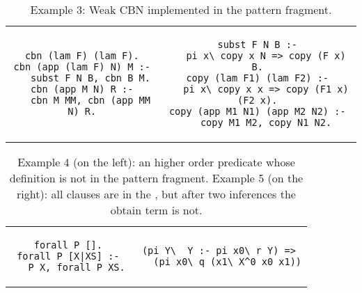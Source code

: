 \documentclass{llncs}
\begin{document}
\begin{table}
\begin{center}
\hspace{-1.5cm}
\begin{tabular}{c@{~~}|@{~~}c}
\begin{minipage}{5.0cm}
\begin{verbatim}
cbn (lam F) (lam F).
cbn (app (lam F) N) M :-
   subst F N B, cbn B M.
cbn (app M N) R :-
   cbn M MM, cbn (app MM N) R.

\end{verbatim}
\end{minipage}
&
\begin{minipage}{5.0cm}
\begin{verbatim}
subst F N B :-
   pi x\ copy x N => copy (F x) B.
copy (lam F1) (lam F2) :-
   pi x\ copy x x => copy (F1 x) (F2 x).
copy (app M1 N1) (app M2 N2) :-
   copy M1 M2, copy N1 N2.
\end{verbatim}
\end{minipage}
\end{tabular}
\end{center}
\caption{\label{example3} Example 3: Weak CBN implemented in the pattern fragment.}
\end{table}

\begin{table}
\begin{center}
\begin{tabular}{c@{~~}|@{~~}c}
\begin{minipage}{5.0cm}
\begin{verbatim}
forall P [].
forall P [X|XS] :-
   P X, forall P XS.
\end{verbatim}
\end{minipage}
&
\begin{minipage}{5.0cm}
\begin{verbatim}
(pi Y\  Y :- pi x0\ r Y) =>
   (pi x0\ q (x1\ X^0 x0 x1))
\end{verbatim}
\end{minipage}
\end{tabular}
\end{center}
\caption{\label{example4} Example 4 (on the left): an higher order predicate whose definition is not in the pattern fragment. Example 5 (on the right): all clauses are in the \frag, but after two inferences the obtain term is not.}
\end{table}
\end{document}
